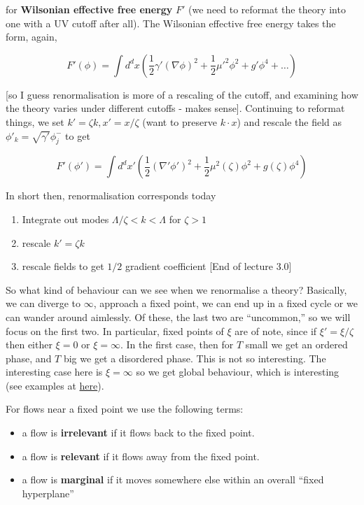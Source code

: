 \documentclass{article}
\theoremstyle{definition}
\begin{document}
for \textbf{Wilsonian effective free energy} $F'$ (we need to reformat the
theory into one with a UV cutoff after all). The Wilsonian effective free energy
takes the form, again,

$$ F'(\phi) = \int d^dx \left( \frac{1}{2} \gamma' (\nabla \phi)^2 + \frac{1}{2}
\mu'^2 \phi^2 + g'\phi^4 + \dots \right) $$

[so I guess renormalisation is more of a rescaling of the cutoff, and examining
how the theory varies under different cutoffs - makes sense]. Continuing to
reformat things, we set $k' = \zeta k, x' = x / \zeta$ (want to preserve $k
\cdot x$) and rescale the field as $\phi'_k = \sqrt{\gamma'} \phi_j^-$ to get

$$ F'(\phi') = \int d^d x' \left( \frac{1}{2} (\nabla' \phi')^2 + \frac{1}{2}
  \mu^2(\zeta) \phi^2 + g(\zeta) \phi^4 \right) $$

In short then, renormalisation corresponds today

\begin{enumerate}
\item Integrate out modes $\Lambda / \zeta < k < \Lambda$ for $\zeta > 1$
\item rescale $k' = \zeta k$
\item rescale fields to get $1/2$ gradient coefficient [End of lecture 3.0]
\end{enumerate}

So what kind of behaviour can we see when we renormalise a theory? Basically, we
can diverge to $\infty$, approach a fixed point, we can end up in a fixed cycle
or we can wander around aimlessly. Of these, the last two are ``uncommon,'' so
we will focus on the first two. In particular, fixed points of $\xi$ are of
note, since if $\xi' = \xi / \zeta$ then either $\xi = 0$ or $\xi = \infty$. In
the first case, then for $T$ small we get an ordered phase, and $T$ big we get a
disordered phase. This is not so interesting. The interesting case here is $\xi
= \infty$ so we get global behaviour, which is interesting (see examples at
\href{http://physics.weber.edu/thermal/computer.html}{here}).

For flows near a fixed point we use the following terms:

\begin{itemize}
\item a flow is \textbf{irrelevant} if it flows back to the fixed point.
\item a flow is \textbf{relevant} if it flows away from the fixed point.
\item a flow is \textbf{marginal} if it moves somewhere else within an overall
  ``fixed hyperplane''
\end{itemize}
\end{document}
